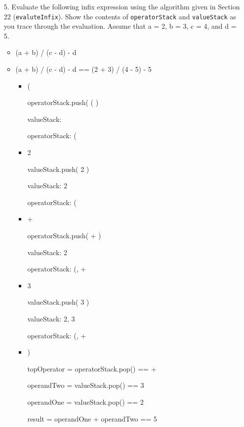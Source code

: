 \documentclass[10pt]{article}
\begin{document}
\begin{enumerate}
		\item[5.] Evaluate the following infix expression using the algorithm given in Section 22 (\texttt{evaluteInfix}). Show the contents of \texttt{operatorStack} and \texttt{valueStack} as you trace through the evaluation. Assume that a = 2, b = 3, c = 4, and d = 5.
			
			\begin{itemize}
				\item (a + b) / (c - d) - d
			\end{itemize}
			
			\vspace{0.5cm}
			\begin{itemize}
				\item (a + b) / (c - d) - d == (2 + 3) / (4 - 5) - 5
					\begin{itemize}
						\item (
						
							operatorStack.push( ( )
							
							valueStack: 
							
							operatorStack: (
						
						\item 2
							
							valueStack.push( 2 )
							
							valueStack: 2
							
							operatorStack: (
						
						\item +
							
							operatorStack.push( + )
							
							valueStack: 2
							
							operatorStack: (, +
						
						\item 3
							
							valueStack.push( 3 )
							
							valueStack: 2, 3
							
							operatorStack: (, +
						
						\item )
							
							topOperator = operatorStack.pop() == +
							
							operandTwo = valueStack.pop() == 3
							
							operandOne = valueStack.pop() == 2
							
							result = operandOne + operandTwo == 5
							

\end{itemize}
\end{itemize}
\end{enumerate}
\end{document}
